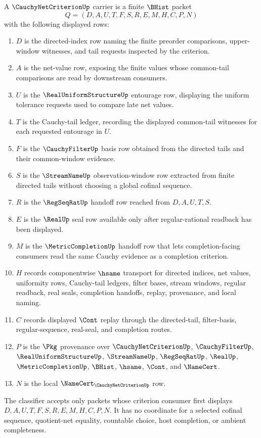 \begin{definition}
\label{def:cauchy-net-criterion-carrier}
A $\CauchyNetCriterionUp$ carrier is a finite $\BHist$ packet
$$
Q=(D,A,U,T,F,S,R,E,M,H,C,P,N)
$$
with the following displayed rows:
\begin{enumerate}
\item $D$ is the directed-index row naming the finite preorder comparisons, upper-window witnesses, and tail requests inspected by the criterion.
\item $A$ is the net-value row, exposing the finite values whose common-tail comparisons are read by downstream consumers.
\item $U$ is the $\RealUniformStructureUp$ entourage row, displaying the uniform tolerance requests used to compare late net values.
\item $T$ is the Cauchy-tail ledger, recording the displayed common-tail witnesses for each requested entourage in $U$.
\item $F$ is the $\CauchyFilterUp$ basis row obtained from the directed tails and their common-window evidence.
\item $S$ is the $\StreamNameUp$ observation-window row extracted from finite directed tails without choosing a global cofinal sequence.
\item $R$ is the $\RegSeqRatUp$ handoff row reached from $D,A,U,T,S$.
\item $E$ is the $\RealUp$ seal row available only after regular-rational readback has been displayed.
\item $M$ is the $\MetricCompletionUp$ handoff row that lets completion-facing consumers read the same Cauchy evidence as a completion criterion.
\item $H$ records componentwise $\hsame$ transport for directed indices, net values, uniformity rows, Cauchy-tail ledgers, filter bases, stream windows, regular readback, real seals, completion handoffs, replay, provenance, and local naming.
\item $C$ records displayed $\Cont$ replay through the directed-tail, filter-basis, regular-sequence, real-seal, and completion routes.
\item $P$ is the $\Pkg$ provenance over $\CauchyNetCriterionUp$, $\CauchyFilterUp$, $\RealUniformStructureUp$, $\StreamNameUp$, $\RegSeqRatUp$, $\RealUp$, $\MetricCompletionUp$, $\BHist$, $\hsame$, $\Cont$, and $\NameCert$.
\item $N$ is the local $\NameCert_{\CauchyNetCriterionUp}$ row.
\end{enumerate}
The classifier accepts only packets whose criterion consumer first displays $D,A,U,T,F,S,R,E,M,H,C,P,N$. It has no coordinate for a selected cofinal sequence, quotient-net equality, countable choice, host completion, or ambient completeness.
\end{definition}


